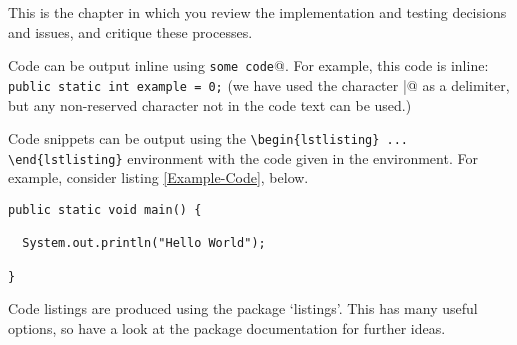 \documentclass[../report.tex]{subfiles}
\begin{document}








This is the chapter in which you review the implementation and testing decisions and issues, and critique these processes.

Code can be output inline using \verb@\lstinline|some code|@.  For example, this code is inline: \lstinline|public static int example = 0;| (we have used the character \verb@|@ as a delimiter, but any non-reserved character not in the code text can be used.)

Code snippets can be output using the \verb|\begin{lstlisting} ... \end{lstlisting}|
environment with the code given in the environment. For example, consider listing \ref{Example-Code}, below.

\begin{lstlisting}[breaklines,breakatwhitespace,caption={Example code},label=Example-Code]
public static void main() {

  System.out.println("Hello World");

}
\end{lstlisting}

Code listings are produced using the package `listings'.  This has many useful options, so have a look at the package documentation for further ideas.
\end{document}
